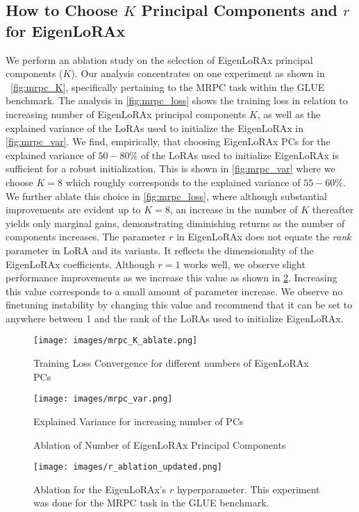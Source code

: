 \subsection{How to Choose $K$ Principal Components and $r$ for EigenLoRAx}
We perform an ablation study on the selection of EigenLoRAx principal components ($K$). Our analysis concentrates on one experiment as shown in ~\autoref{fig:mrpc_K}, specifically pertaining to the MRPC task within the GLUE~\citep{glue} benchmark. The analysis in \autoref{fig:mrpc_loss} shows the training loss in relation to increasing number of EigenLoRAx principal components $K$, as well as the explained variance of the LoRAs used to initialize the EigenLoRAx in \autoref{fig:mrpc_var}. We find, empirically, that choosing EigenLoRAx PCs for the explained variance of $50-80\%$ of the LoRAs used to initialize EigenLoRAx is sufficient for a robust initialization. This is shown in \cref{fig:mrpc_var} where we choose $K=8$ which roughly corresponds to the explained variance of $55-60\%$. We further ablate this choice in \cref{fig:mrpc_loss}, where although substantial improvements are evident up to $K = 8$, an increase in the number of $K$ thereafter yields only marginal gains, demonstrating diminishing returns as the number of components increases. The parameter $r$ in EigenLoRAx does not equate the \textit{rank} parameter in LoRA and its variants. It reflects the dimensionality of the EigenLoRAx coefficients. Although $r=1$ works well, we observe slight performance improvements as we increase this value as shown in \cref{fig:r_ablate}. Increasing this value corresponds to a small amount of parameter increase. We observe no finetuning instability by changing this value and recommend that it can be set to anywhere between 1 and the rank of the LoRAs used to initialize EigenLoRAx.
\begin{figure}[!htb]
    \centering
    \begin{minipage}{0.49\textwidth}
        \centering
        \texttt{[image: images/mrpc\_K\_ablate.png]} %
        \caption{Training Loss Convergence for different numbers of EigenLoRAx PCs}
        \label{fig:mrpc_loss}
    \end{minipage}\hfill
    \begin{minipage}{0.49\textwidth}
        \centering
        \texttt{[image: images/mrpc\_var.png]} %
        \caption{Explained Variance for increasing number of PCs}
    \label{fig:mrpc_var}
    \end{minipage}
    \caption{Ablation of Number of EigenLoRAx Principal Components}
    \label{fig:mrpc_K}
\end{figure}
\begin{figure}[h]
  \begin{center}
    \texttt{[image: images/r\_ablation\_updated.png]}
  \end{center}
  \caption{Ablation for the EigenLoRAx's $r$ hyperparameter. This experiment was done for the MRPC task in the GLUE benchmark.}
  \label{fig:r_ablate}
\end{figure}
